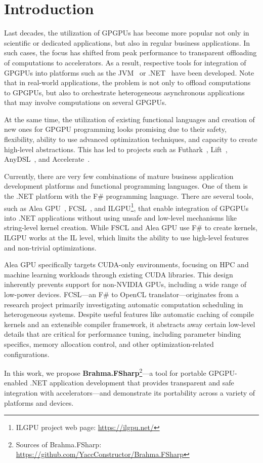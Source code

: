 \section{Introduction}

Last decades, the utilization of GPGPUs has become more popular not only in scientific or dedicated applications, but also in regular business applications.
In such cases, the focus has shifted from peak performance to transparent offloading of computations to accelerators.
As a result, respective tools for integration of GPGPUs into platforms such as the JVM~\cite{rootbeer,jcuda,ScalaGPU} or .NET~\cite{FSCLPhD,aleaGPUasync} have been developed.
Note that in real-world applications, the problem is not only to offload computations to GPGPUs, but also to orchestrate heterogeneous asynchronous applications that may involve computations on several GPGPUs.

At the same time, the utilization of existing functional languages and creation of new ones for GPGPU programming looks promising due to their safety, flexibility, ability to use advanced optimization techniques, and capacity to create high-level abstractions. 
This has led to projects such as Futhark~\cite{10.1145/3140587.3062354}, Lift~\cite{10.5555/3049832.3049841}, AnyDSL~\cite{10.1145/3276489}, and Accelerate~\cite{10.1145/1926354.1926358}.

Currently, there are very few combinations of mature business application development platforms and functional programming languages.
One of them is the .NET platform with the F\# programming language.
There are several tools, such as Alea GPU~\cite{aleaGPUasync}, FCSL~\cite{FSCLPhD}, and ILGPU\footnote{ILGPU project web page: \url{https://ilgpu.net/}}, that enable integration of GPGPUs into .NET applications without using unsafe and low-level mechanisms like string-level kernel creation.
While FSCL and Alea GPU use F\# to create kernels, ILGPU works at the IL level, which limits the ability to use high-level features and non-trivial optimizations.

Alea GPU specifically targets CUDA-only environments, focusing on HPC and machine learning workloads through existing CUDA libraries.
This design inherently prevents support for non-NVIDIA GPUs, including a wide range of low-power devices. 
FCSL---an F\# to OpenCL translator---originates from a research project primarily investigating automatic computation scheduling in heterogeneous systems.
Despite useful features like automatic caching of compile kernels and an extensible compiler framework, it abstracts away certain low-level details that are critical for performance tuning, including parameter binding specifics, memory allocation control, and other optimization-related configurations.


In this work, we propose \textbf{Brahma.FSharp}\footnote{
    Sources of Brahma.FSharp: \url{https://github.com/YaccConstructor/Brahma.FSharp}
}---a tool for portable GPGPU-enabled .NET application development that provides transparent and safe integration with accelerators---and demonstrate its portability across a variety of platforms and devices.